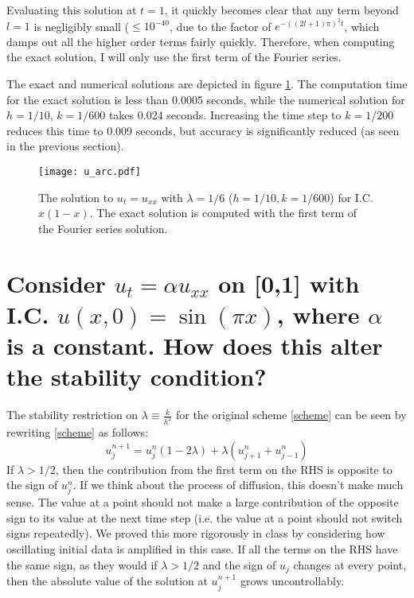 \documentclass[11pt]{amsart}
\begin{document}
 Evaluating this solution at $t=1$, it quickly becomes clear that any term beyond $l=1$ is negligibly small ($\le 10^{-40}$, due to the factor of  $e^{-((2l+1)\pi)^2 t}$, which damps out all the higher order terms fairly quickly.  Therefore, when computing the exact solution, I will only use the first term of the Fourier series. 
 
 The exact and numerical solutions are depicted in figure \ref{uarc}.  The computation time for the exact solution is less than 0.0005 seconds, while the numerical solution for $h=1/10$, $k=1/600$ takes 0.024 seconds. Increasing the time step to $k=1/200$ reduces this time to 0.009 seconds, but accuracy is significantly reduced (as seen in the previous section). 
 \begin{figure}[t]
\begin{center} 
\texttt{[image: u\_arc.pdf]}
\caption{The solution to $u_t = u_{xx}$ with  $\lambda =1/6$ ($h=1/10 , k = 1/600$) for I.C. $x(1-x)$. The exact solution is computed with the first  term of the Fourier series solution.  }
\label{uarc} 
\end{center}
\end{figure}
 
\section{Consider $u_t = \alpha u_{xx}$ on [0,1] with I.C. $u(x,0)= \sin(\pi x)$, where $\alpha$ is a constant. How does this alter the stability condition? }
The stability restriction on $\lambda \equiv \frac{k}{h^2}$ for the original scheme \eqref{scheme} can be seen by rewriting \eqref{scheme} as follows: 
\begin{equation} 
u_j^{n+1} = u_j^n(1-2\lambda ) + \lambda(u_{j+1}^n + u_{j-1}^n)
\end{equation} 
If $\lambda > 1/2$, then the contribution from the first term on the RHS is opposite to the sign of $u_j^n$. If we think about the process of diffusion, this doesn't make much sense. The value at a point should not  make a large contribution of the opposite sign to its value at the next time step (i.e. the value at a point should not switch signs repeatedly). We proved this more rigorously in class by considering how oscillating initial data is amplified in this case. If all the terms on the RHS have the same sign,  as they would if $\lambda >1/2$ and the sign of $u_j$ changes at every point, then the absolute value  of the solution at $u_j^{n+1}$ grows uncontrollably. 
\end{document}
